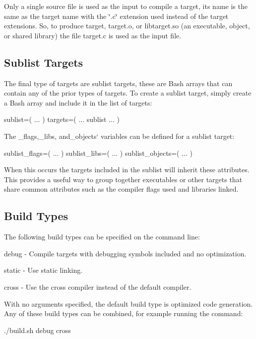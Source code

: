 Only a single source file is used as the input to compile a target, its name is the same as the target name with the \char`\"{}.\+c\char`\"{} extension used instead of the target extensions. So, to produce {\ttfamily target}, {\ttfamily target.\+o}, or {\ttfamily libtarget.\+so} (an executable, object, or shared library) the file {\ttfamily target.\+c} is used as the input file.

\subsection*{Sublist Targets }

The final type of targets are sublist targets, these are Bash arrays that can contain any of the prior types of targets. To create a sublist target, simply create a Bash array and include it in the list of targets\+: \begin{DoxyVerb}sublist=( ... )
targets=( ... sublist ... )
\end{DoxyVerb}


The {\ttfamily \+\_\+flags,}\+\_\+libs{\ttfamily , and}\+\_\+objects` variables can be defined for a sublist target\+: \begin{DoxyVerb}sublist_flags=( ... )
sublist_libs=( ... )
sublist_objects=( ... )
\end{DoxyVerb}


When this occurs the targets included in the sublist will inherit these attributes. This provides a useful way to group together executables or other targets that share common attributes such as the compiler flags used and libraries linked.

\subsection*{Build Types }

The following build types can be specified on the command line\+:


\begin{DoxyItemize}
\item {\ttfamily debug} -\/ Compile targets with debugging symbols included and no optimization.
\item {\ttfamily static} -\/ Use static linking.
\item {\ttfamily cross} -\/ Use the cross compiler instead of the default compiler.
\end{DoxyItemize}

With no arguments specified, the default build type is optimized code generation. Any of these build types can be combined, for example running the command\+: \begin{DoxyVerb}./build.sh debug cross
\end{DoxyVerb}


